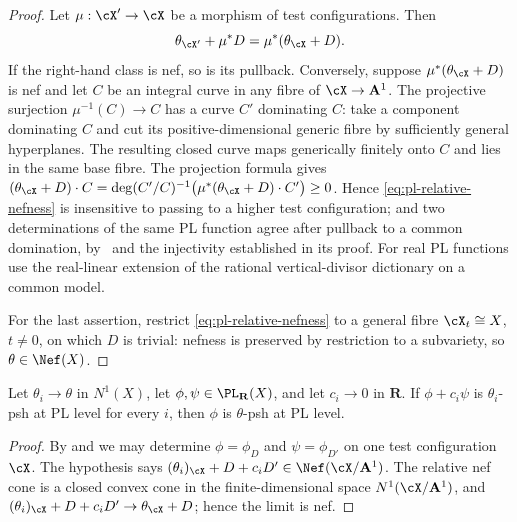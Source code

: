 \begin{proof}
Let $\mu:\cX'\to\cX$ be a morphism of test configurations.  Then
\[
 \theta_{\cX'}+\mu^*D=\mu^*(\theta_{\cX}+D).
\]
If the right-hand class is nef, so is its pullback.  Conversely, suppose
$\mu^*(\theta_{\cX}+D)$ is nef and let $C$ be an integral curve
in any fibre of $\cX\to\mathbf A^1$.  The projective surjection
$\mu^{-1}(C)\to C$ has a curve $C'$ dominating $C$:
take a component dominating $C$ and cut its positive-dimensional
generic fibre by sufficiently general hyperplanes.
The resulting closed curve maps generically finitely onto $C$ and
lies in the same base fibre.  The projection formula gives
$(\theta_{\cX}+D)\cdot C=\deg(C'/C)^{-1}
\bigl(\mu^*(\theta_{\cX}+D)\cdot C'\bigr)\ge0$.  Hence
\eqref{eq:pl-relative-nefness} is insensitive to passing to a higher test
configuration; and two determinations of the same PL function agree after
pullback to a common domination, by
\ and the injectivity established in its
proof.  For real PL functions use the real-linear extension of
the rational vertical-divisor dictionary on a common model.

For the last assertion, restrict \eqref{eq:pl-relative-nefness} to a general
fibre $\cX_t\cong X$, $t\ne0$, on which $D$ is trivial: nefness is
preserved by restriction to a subvariety, so
$\theta\in\Nef(X)$.
\end{proof}

\begin{lemma}
\label{lem:ch34-pl-limit-classes}
Let $\theta_i\to\theta$ in $N^1(X)$, let
$\phi,\psi\in\PL_{\mathbf R}(X)$, and let $c_i\to0$ in $\mathbf R$.
If $\phi+c_i\psi$ is $\theta_i$-psh at PL level for every $i$, then
$\phi$ is $\theta$-psh at PL level.
\end{lemma}

\begin{proof}
By  and
 we may determine $\phi=\phi_D$
and $\psi=\phi_{D'}$ on one test configuration $\cX$.  The hypothesis
says $(\theta_i)_{\cX}+D+c_iD'\in\Nef(\cX/\mathbf A^1)$.  The relative nef
cone is a closed convex cone in the finite-dimensional space
$N^1(\cX/\mathbf A^1)$, and
$(\theta_i)_{\cX}+D+c_iD'\to\theta_{\cX}+D$; hence the limit is nef.
\end{proof}

